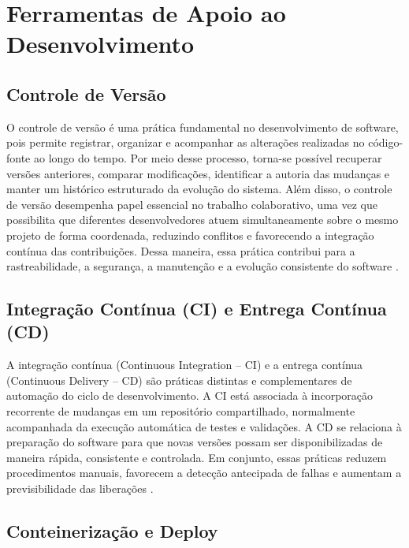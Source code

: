 % 

\section{Ferramentas de Apoio ao Desenvolvimento}

\subsection{Controle de Versão}

O controle de versão é uma prática fundamental no desenvolvimento de software, pois permite registrar, organizar e acompanhar as alterações realizadas no código-fonte ao longo do tempo. Por meio desse processo, torna-se possível recuperar versões anteriores, comparar modificações, identificar a autoria das mudanças e manter um histórico estruturado da evolução do sistema. Além disso, o controle de versão desempenha papel essencial no trabalho colaborativo, uma vez que possibilita que diferentes desenvolvedores atuem simultaneamente sobre o mesmo projeto de forma coordenada, reduzindo conflitos e favorecendo a integração contínua das contribuições. Dessa maneira, essa prática contribui para a rastreabilidade, a segurança, a manutenção e a evolução consistente do software \cite{chacon2014}.


\subsection{Integração Contínua (CI) e Entrega Contínua (CD)}

A integração contínua (Continuous Integration -- CI) e a entrega contínua (Continuous Delivery -- CD) são práticas distintas e complementares de automação do ciclo de desenvolvimento. A CI está associada à incorporação recorrente de mudanças em um repositório compartilhado, normalmente acompanhada da execução automática de testes e validações. A CD se relaciona à preparação do software para que novas versões possam ser disponibilizadas de maneira rápida, consistente e controlada. Em conjunto, essas práticas reduzem procedimentos manuais, favorecem a detecção antecipada de falhas e aumentam a previsibilidade das liberações \cite{gitlabcicd2026}.

\subsection{Conteinerização e Deploy }

